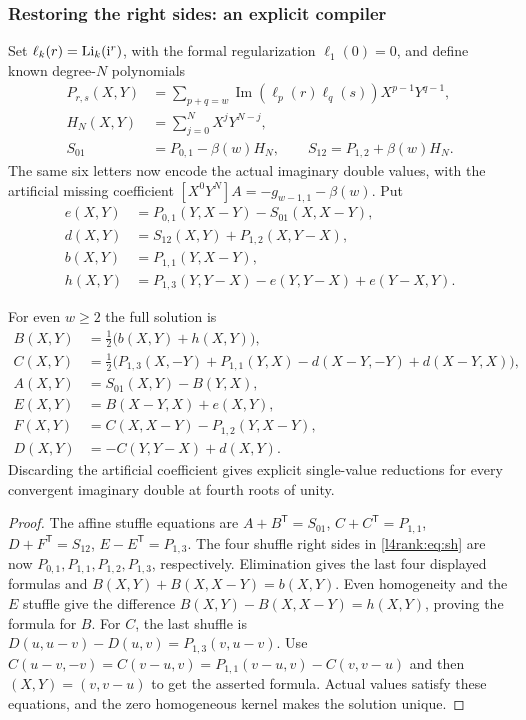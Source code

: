 \subsubsection{Restoring the right sides: an explicit compiler}
\label{l4rank:sec:compiler}
Set $\ell_k(r)=\operatorname{Li}_k(\mathrm i^r)$, with the formal regularization
$\ell_1(0)=0$, and define known degree-$N$ polynomials
\begin{align*}
 P_{r,s}(X,Y)&=\sum_{p+q=w}\operatorname{Im}(\ell_p(r)\ell_q(s))
                    X^{p-1}Y^{q-1},\\
 H_N(X,Y)&=\sum_{j=0}^{N}X^jY^{N-j},\\
 S_{01}&=P_{0,1}-\beta(w)H_N,\qquad
 S_{12}=P_{1,2}+\beta(w)H_N.
\end{align*}
The same six letters now encode the actual imaginary double values,
with the artificial missing coefficient $[X^0Y^N]A=-g_{w-1,1}-\beta(w)$.
Put
\begin{align*}
 e(X,Y)&=P_{0,1}(Y,X-Y)-S_{01}(X,X-Y),\\
 d(X,Y)&=S_{12}(X,Y)+P_{1,2}(X,Y-X),\\
 b(X,Y)&=P_{1,1}(Y,X-Y),\\
 h(X,Y)&=P_{1,3}(Y,Y-X)-e(Y,Y-X)+e(Y-X,Y).
\end{align*}

\begin{theorem}\label{l4rank:thm:compiler}
For even $w\ge2$ the full solution is
\begin{align*}
 B(X,Y)&=\tfrac12\bigl(b(X,Y)+h(X,Y)\bigr),\\
 C(X,Y)&=\tfrac12\bigl(P_{1,3}(X,-Y)+P_{1,1}(Y,X)
                    -d(X-Y,-Y)+d(X-Y,X)\bigr),\\
 A(X,Y)&=S_{01}(X,Y)-B(Y,X),\\
 E(X,Y)&=B(X-Y,X)+e(X,Y),\\
 F(X,Y)&=C(X,X-Y)-P_{1,2}(Y,X-Y),\\
 D(X,Y)&=-C(Y,Y-X)+d(X,Y).
\end{align*}
Discarding the artificial coefficient gives explicit single-value reductions
for every convergent imaginary double at fourth roots of unity.
\end{theorem}
\begin{proof}
The affine stuffle equations are
$A+B^{\mathsf T}=S_{01}$, $C+C^{\mathsf T}=P_{1,1}$,
$D+F^{\mathsf T}=S_{12}$, $E-E^{\mathsf T}=P_{1,3}$.
The four shuffle right sides in \eqref{l4rank:eq:sh} are now
$P_{0,1},P_{1,1},P_{1,2},P_{1,3}$, respectively.
Elimination gives the last four displayed formulas and
$B(X,Y)+B(X,X-Y)=b(X,Y)$.
Even homogeneity and the $E$ stuffle give the difference
$B(X,Y)-B(X,X-Y)=h(X,Y)$, proving the formula for $B$.
For $C$, the last shuffle is
$D(u,u-v)-D(u,v)=P_{1,3}(v,u-v)$.
Use
$C(u-v,-v)=C(v-u,v)=P_{1,1}(v-u,v)-C(v,v-u)$
and then $(X,Y)=(v,v-u)$ to get the asserted formula.
Actual values satisfy these equations, and the zero homogeneous kernel
makes the solution unique.
\end{proof}

